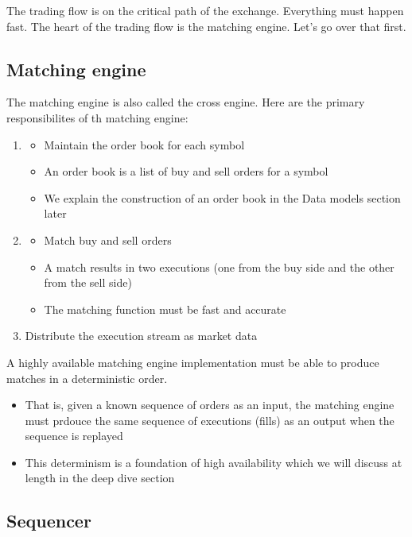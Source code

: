 \documentclass{report}
\theoremstyle{definition}
\let\oldsubsection\subsection
\renewcommand{\subsection}{\oldsubsection*}
\begin{document}
The trading flow is on the critical path of the exchange. Everything must happen fast. The heart of the trading flow is the matching engine. Let's go over that first.

\subsection{Matching engine}

The matching engine is also called the cross engine. Here are the primary responsibilites of th matching engine:

\begin{enumerate}
\item

\begin{itemize}
\item
Maintain the order book for each symbol
\item
An order book is a list of buy and sell orders for a symbol
\item
We explain the construction of an order book in the Data models section later
\end{itemize}

\item

\begin{itemize}
\item
Match buy and sell orders
\item
A match results in two executions (one from the buy side and the other from the sell side)
\item
The matching function must be fast and accurate
\end{itemize}
\item
Distribute the execution stream as market data
\end{enumerate}

A highly available matching engine implementation must be able to produce matches in a deterministic order.

\begin{itemize}
\item
That is, given a known sequence of orders as an input, the matching engine must prdouce the same sequence of executions (fills) as an output when the sequence is replayed
\item
This determinism is a foundation of high availability which we will discuss at length in the deep dive section
\end{itemize}

\subsection{Sequencer}
\end{document}
